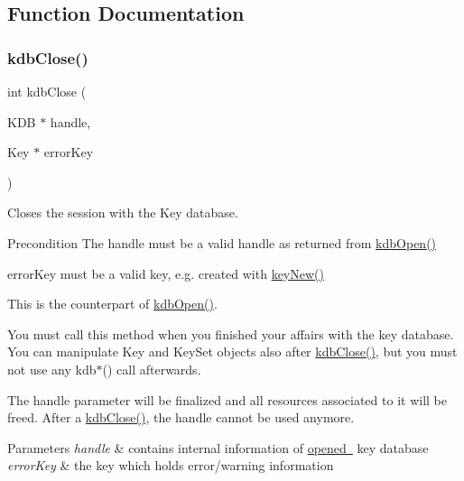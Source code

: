 \subsection{Function Documentation}
\mbox{\label{group__kdb_gadb54dc9fda17ee07deb9444df745c96f}} 
\subsubsection{\texorpdfstring{kdbClose()}{kdbClose()}}
{\footnotesize\ttfamily int kdb\+Close (\begin{DoxyParamCaption}\item[{K\+DB $\ast$}]{handle,  }\item[{Key $\ast$}]{error\+Key }\end{DoxyParamCaption})}



Closes the session with the Key database. 

\begin{DoxyPrecond}{Precondition}
The handle must be a valid handle as returned from \mbox{\hyperlink{group__kdb_ga6808defe5870f328dd17910aacbdc6ca}{kdb\+Open()}}

error\+Key must be a valid key, e.\+g. created with \mbox{\hyperlink{group__key_gad23c65b44bf48d773759e1f9a4d43b89}{key\+New()}}
\end{DoxyPrecond}
This is the counterpart of \mbox{\hyperlink{group__kdb_ga6808defe5870f328dd17910aacbdc6ca}{kdb\+Open()}}.

You must call this method when you finished your affairs with the key database. You can manipulate Key and Key\+Set objects also after \mbox{\hyperlink{group__kdb_gadb54dc9fda17ee07deb9444df745c96f}{kdb\+Close()}}, but you must not use any kdb$\ast$() call afterwards.

The {\ttfamily handle} parameter will be finalized and all resources associated to it will be freed. After a \mbox{\hyperlink{group__kdb_gadb54dc9fda17ee07deb9444df745c96f}{kdb\+Close()}}, the {\ttfamily handle} cannot be used anymore.


\begin{DoxyParams}{Parameters}
{\em handle} & contains internal information of \mbox{\hyperlink{group__kdb_ga6808defe5870f328dd17910aacbdc6ca}{opened }} key database \\
\hline
{\em error\+Key} & the key which holds error/warning information \\
\hline
\end{DoxyParams}

